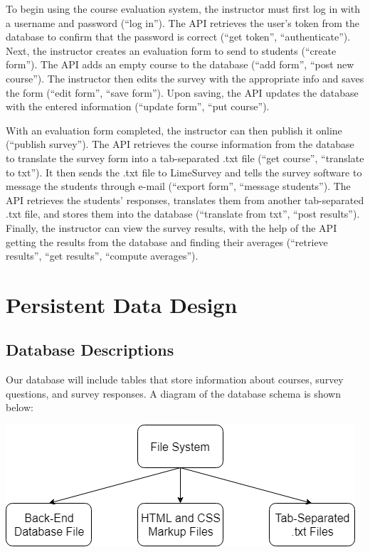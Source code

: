 \documentclass{article}
\begin{document}
\newpage

To begin using the course evaluation system, the instructor must first log in with a username and password (``log in''). The API retrieves the user's token from the database to confirm that the password is correct (``get token'', ``authenticate''). Next, the instructor creates an evaluation form to send to students (``create form''). The API adds an empty course to the database (``add form'', ``post new course''). The instructor then edits the survey with the appropriate info and saves the form (``edit form'', ``save form''). Upon saving, the API updates the database with the entered information (``update form'', ``put course'').

With an evaluation form completed, the instructor can then publish it online (``publish survey''). The API retrieves the course information from the database to translate the survey form into a tab-separated .txt file (``get course'', ``translate to txt''). It then sends the .txt file to LimeSurvey and tells the survey software to message the students through e-mail (``export form'', ``message students''). The API retrieves the students' responses, translates them from another tab-separated .txt file, and stores them into the database (``translate from txt'', ``post results''). Finally, the instructor can view the survey results, with the help of the API getting the results from the database and finding their averages (``retrieve results'', ``get results'', ``compute averages'').

\section{Persistent Data Design}
\subsection{Database Descriptions}

Our database will include tables that store information about courses, survey questions, and survey responses. A diagram of the database schema is shown below:

\begin{center}
\label{fig:schemadiagram}
{\includegraphics[scale=.6]{images/file_structure_diagram.png}} 
\end{center}
\end{document}
